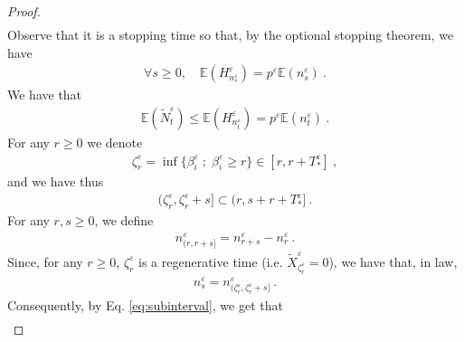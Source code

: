 \documentclass[reqno, 12pt, a4paper]{amsart}
\theoremstyle{plain}
\theoremstyle{definition}
\begin{document}
\begin{proof}
\begin{equation}
\begin{split}
\end{split}
\end{equation}
Observe that it is a stopping time so that, by the optional stopping theorem, we have
\begin{equation}
\begin{split}
\forall s \ge 0, \quad \mathbb E (H^\varepsilon_{n_s^\varepsilon}) = p^\varepsilon \mathbb E (n_s^\varepsilon) \ .
\end{split}
\end{equation}
We have that
\begin{equation}
\begin{split}
\mathbb E (\tilde N_t^\varepsilon) \le \mathbb E (H^\varepsilon_{n_t^\varepsilon}) = p^\varepsilon \mathbb E (n_t^\varepsilon) \ . 
\end{split}
\end{equation}
For any $r\ge 0$ we denote
\begin{equation}
\begin{split}
\zeta_r^\varepsilon=\inf\{ \beta_i^\varepsilon \; ; \; \beta_i^\varepsilon \ge r\} \in [r, r+T_*^\varepsilon]  \ ,
\end{split}
\end{equation}
and we have thus
 \begin{equation}
\label{eq:subinterval}
\begin{split}
(\zeta_r^\varepsilon , \zeta_r^\varepsilon + s] \subset (r, s+r+T_*^\varepsilon] \ .
\end{split}
\end{equation}
For any $r,s \ge 0$, we define
\begin{equation}
\begin{split}
n_{(r, r+s]}^\varepsilon = n_{r+s}^\varepsilon - n_r^\varepsilon \ . 
\end{split}
\end{equation}
Since, for any $r\ge 0$,  $\zeta_r^\varepsilon$ is a regenerative time (i.e. ${\tilde X}^\varepsilon_{\zeta_{r}^\varepsilon} =0$), we have that, in law, 
\begin{equation}
\begin{split}
n_s^\varepsilon = n_{\big(\zeta_r^\varepsilon , \zeta_r^\varepsilon + s \big]}^\varepsilon \ . 
\end{split}
\end{equation}
Consequently, by Eq. \eqref{eq:subinterval}, we get that 
\begin{equation}
\begin{split}

\end{split}
\end{equation}
\end{proof}
\end{document}
